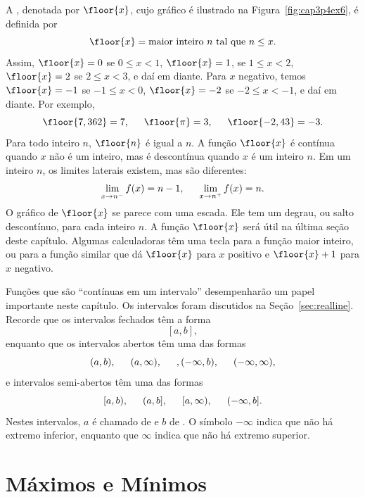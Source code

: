 \begin{example}
  A %
  , denotada por
  $\floor{x}$, cujo gráfico é ilustrado na Figura~\ref{fig:cap3p4ex6},
  é definida por
  $$
    \floor{x} = \text{maior inteiro } n \text{ tal que } n \le x.
  $$
  Assim, $\floor{x} = 0$ se $0 \le x < 1$, $\floor{x} = 1$,
  se $1 \le x < 2$, $\floor{x} = 2$ se $2 \le x < 3$, e daí em diante.
  Para $x$ negativo, temos $\floor{x} = -1$ se $-1 \le x < 0$,
  $\floor{x} = -2$ se $-2 \le x < -1$, e daí em diante. Por exemplo,
  $$
    \floor{7,362} = 7, \hspace{1.5em}
    \floor{\pi} = 3, \hspace{1.5em}
    \floor{-2,43} = -3.
  $$
  Para todo inteiro $n$, $\floor{n}$ é igual a $n$. A função $\floor{x}$
  é contínua quando $x$ não é um inteiro, mas é descontínua quando $x$ é
  um inteiro $n$. Em um inteiro $n$, os limites laterais existem, mas são
  diferentes:
  $$
    \lim_{x \to n^-} f(x) = n-1, \hspace{1.5em}
    \lim_{x \to n^+} f(x) = n.
  $$
  O gráfico de $\floor{x}$ se parece com uma escada. Ele tem um degrau,
  ou salto descontínuo, para cada inteiro $n$. A função $\floor{x}$ será
  útil na última seção deste capítulo. Algumas calculadoras têm uma tecla
  para a função maior inteiro, ou para a função similar que dá $\floor{x}$
  para $x$ positivo e $\floor{x} + 1$ para $x$ negativo.
\end{example}

Funções que são ``contínuas em um intervalo'' desempenharão um papel
importante neste capítulo. Os intervalos foram discutidos na
Seção~\ref{sec:realline}. Recorde que os intervalos fechados têm a forma
$$
  [a, b],
$$
enquanto que os intervalos abertos têm uma das formas
$$
  (a, b), \hspace{1.5em} (a, \infty), \hspace{1.5em}, (-\infty, b),
  \hspace{1.5em} (-\infty, \infty),
$$
e intervalos semi-abertos têm uma das formas
$$
  [a, b), \hspace{1.5em} (a, b], \hspace{1.5em} [a, \infty),
  \hspace{1.5em} (-\infty, b].
$$
Nestes intervalos, $a$ é chamado de  e $b$ de
. O símbolo $-\infty$ indica que não há extremo
inferior, enquanto que $\infty$ indica que não há extremo superior.
\section{Máximos e Mínimos}
\label{sec:maxmin}

